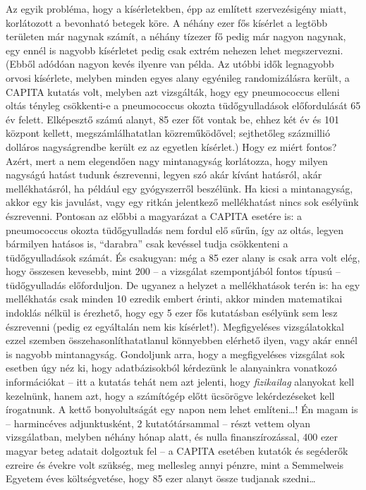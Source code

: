 \documentclass[magyar,]{book}
\begin{document}
Az egyik probléma, hogy a kísérletekben, épp az említett szervezésigény miatt, korlátozott a bevonható betegek köre. A néhány ezer fős kísérlet a legtöbb területen már nagynak számít, a néhány tízezer fő pedig már nagyon nagynak, egy ennél is nagyobb kísérletet pedig csak extrém nehezen lehet megszervezni. (Ebből adódóan nagyon kevés ilyenre van példa. Az utóbbi idők legnagyobb orvosi kísérlete, melyben minden egyes alany egyénileg randomizálásra került, a CAPITA kutatás volt, melyben azt vizsgálták, hogy egy pneumococcus elleni oltás tényleg csökkenti-e a pneumococcus okozta tüdőgyulladások előfordulását 65 év felett. Elképesztő számú alanyt, 85 ezer főt vontak be, ehhez két év és 101 központ kellett, megszámlálhatatlan közreműködővel; sejthetőleg százmillió dolláros nagyságrendbe került ez az egyetlen kísérlet.) Hogy ez miért fontos? Azért, mert a nem elegendően nagy mintanagyság korlátozza, hogy milyen nagyságú hatást tudunk észrevenni, legyen szó akár kívánt hatásról, akár mellékhatásról, ha például egy gyógyszerről beszélünk. Ha kicsi a mintanagyság, akkor egy kis javulást, vagy egy ritkán jelentkező mellékhatást nincs sok esélyünk észrevenni. Pontosan az előbbi a magyarázat a CAPITA esetére is: a pneumococcus okozta tüdőgyulladás nem fordul elő sűrűn, így az oltás, legyen bármilyen hatásos is, \enquote{darabra} csak kevéssel tudja csökkenteni a tüdőgyulladások számát. És csakugyan: még a 85 ezer alany is csak arra volt elég, hogy összesen kevesebb, mint 200 -- a vizsgálat szempontjából fontos típusú -- tüdőgyulladás előforduljon. De ugyanez a helyzet a mellékhatások terén is: ha egy mellékhatás csak minden 10 ezredik embert érinti, akkor minden matematikai indoklás nélkül is érezhető, hogy egy 5 ezer fős kutatásban esélyünk sem lesz észrevenni (pedig ez egyáltalán nem kis kísérlet!). Megfigyeléses vizsgálatokkal ezzel szemben összehasonlíthatatlanul könnyebben elérhető ilyen, vagy akár ennél is nagyobb mintanagyság. Gondoljunk arra, hogy a megfigyeléses vizsgálat sok esetben úgy néz ki, hogy adatbázisokból kérdezünk le alanyainkra vonatkozó információkat -- itt a kutatás tehát nem azt jelenti, hogy \emph{fizikailag} alanyokat kell kezelnünk, hanem azt, hogy a számítógép előtt ücsörögve lekérdezéseket kell írogatnunk. A kettő bonyolultságát egy napon nem lehet említeni\ldots! Én magam is -- harmincéves adjunktusként, 2 kutatótársammal -- részt vettem olyan vizsgálatban, melyben néhány hónap alatt, és nulla finanszírozással, 400 ezer magyar beteg adatait dolgoztuk fel -- a CAPITA esetében kutatók és segéderők ezreire és évekre volt szükség, meg mellesleg annyi pénzre, mint a Semmelweis Egyetem éves költségvetése, hogy 85 ezer alanyt össze tudjanak szedni\ldots{}
\end{document}
